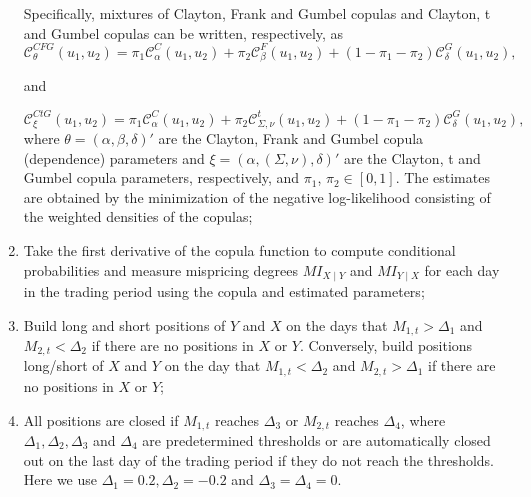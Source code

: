 \documentclass[a4paper]{article}
\begin{document}
\begin{enumerate}
	Specifically, mixtures of Clayton, Frank and Gumbel copulas and Clayton, t and Gumbel copulas can be written, respectively, as
	\begin{equation}
	\mathcal{C}_{\theta}^{CFG}\left(u_{1},u_{2}\right)=\pi_{1}\mathcal{C}_{\alpha}^{C}\left(u_{1},u_{2}\right)+\pi_{2}\mathcal{C}_{\beta}^{F}\left(u_{1},u_{2}\right)+\left(1-\pi_{1}-\pi_{2}\right)\mathcal{C}_{\delta}^{G}\left(u_{1},u_{2}\right),
	\label{eq:eq24}
	\end{equation}
	
	and
	
	\begin{equation}
	\mathcal{C}_{\xi}^{CtG}\left(u_{1},u_{2}\right)=\pi_{1}\mathcal{C}_{\alpha}^{C}\left(u_{1},u_{2}\right)+\pi_{2}\mathcal{C}_{\Sigma,\nu}^{t}\left(u_{1},u_{2}\right)+\left(1-\pi_{1}-\pi_{2}\right)\mathcal{C}_{\delta}^{G}\left(u_{1},u_{2}\right),
	\label{eq:eq25}
	\end{equation}
	where $\theta=\left(\alpha,\beta,\delta\right)'$ are the Clayton, Frank and Gumbel copula (dependence) parameters and $\xi=\left(\alpha,(\Sigma,\nu),\delta\right)'$ are the Clayton, t and Gumbel copula parameters, respectively, and $\pi_{1}$, $\pi_{2} \in [0,1]$. The estimates are obtained by the minimization of the negative log-likelihood consisting of the weighted densities of the copulas; 
	
	\vspace{0.3cm}
	\vspace{0.3cm}
	
\item Take the first derivative of the copula function to compute conditional
		probabilities and measure mispricing degrees $MI_{X\mid Y}$ and $MI_{Y\mid X}$ for each day in the trading period using the copula and estimated parameters;
		
	\vspace{0.3cm}
	\vspace{0.3cm}
		
\item Build long and short positions of $Y$ and $X$ on the days that $M_{1,t}>\Delta_{1}$ and $M_{2,t}<\Delta_{2}$ if there are no positions in $X$ or $Y$. Conversely, build positions long/short of $X$ and $Y$ on the day that $M_{1,t}<\Delta_{2}$ and $M_{2,t}>\Delta_{1}$ if there are no positions in $X$ or $Y$;
	
	\vspace{0.6cm}
		
\item All positions are closed if $M_{1,t}$ reaches $\Delta_{3}$ or $M_{2,t}$ reaches $\Delta_{4}$, where $\Delta_{1},\Delta_{2},\Delta_{3}$ and $\Delta_{4}$ are predetermined thresholds or are automatically closed out on the last day of the trading period if they do not reach the thresholds. Here we use $\Delta_{1}=0.2, \Delta_{2}=-0.2$ and $\Delta_{3}=\Delta_{4}=0$.

\end{enumerate}
\end{document}

